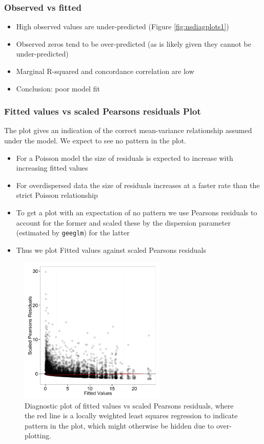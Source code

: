 \begin{frame}
\frametitle{Observed vs fitted}
\begin{itemize}
\item High observed values are under-predicted (Figure \ref{fig:nsdiagplots1})
\item Observed zeros tend to be over-predicted  (as is likely given they cannot be under-predicted)
\item Marginal R-squared and concordance correlation are low
\pause
\bigskip
\item Conclusion: poor model fit
\end{itemize}
\end{frame}


\begin{frame}[fragile]
\frametitle{Fitted values vs scaled Pearsons residuals Plot}
The plot gives an indication of the correct mean-variance relationship assumed under the model.  We expect to see no pattern in the plot.  

\begin{itemize}
\item For a Poisson model the size of residuals is expected to increase with increasing fitted values
\item For overdispersed data the size of residuals increases at a faster rate than the strict Poisson relationship
\item To get a plot with an expectation of no pattern we use Pearsons residuals to account for the former and scaled these by the dispersion parameter (estimated by {\tt geeglm}) for the latter
\item Thus we plot Fitted values against scaled Pearsons residuals
\end{itemize}
\end{frame}

\begin{frame}[fragile]
\begin{figure}[h]
  \centering
    \includegraphics[width=7cm]{bc/FitPlots_resids.png}
  \caption{Diagnostic plot of fitted values vs scaled Pearsons residuals, where the red line is a locally weighted least squares regression to indicate pattern in the plot, which might otherwise be hidden due to over-plotting.}
  \label{fig:nsdiagplots2}
\end{figure}
\end{frame}

